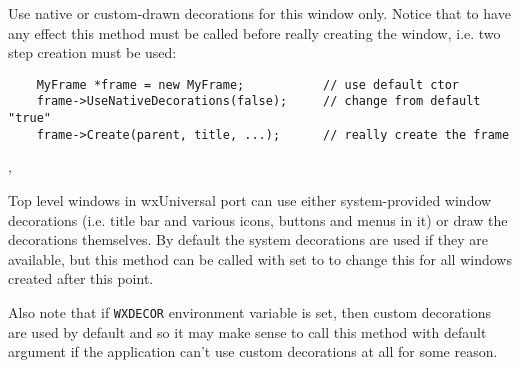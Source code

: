 

\label{wxtoplevelwindowusenativedecorations}



Use native or custom-drawn decorations for this window only. Notice that to
have any effect this method must be called before really creating the window,
i.e. two step creation must be used:
\begin{verbatim}
    MyFrame *frame = new MyFrame;           // use default ctor
    frame->UseNativeDecorations(false);     // change from default "true"
    frame->Create(parent, title, ...);      // really create the frame
\end{verbatim}


,\\


\label{wxtoplevelwindowusenativedecorationsbydefault}



Top level windows in wxUniversal port can use either system-provided window
decorations (i.e. title bar and various icons, buttons and menus in it) or draw
the decorations themselves. By default the system decorations are used if they
are available, but this method can be called with  set to \false to
change this for all windows created after this point.

Also note that if \texttt{WXDECOR} environment variable is set, then custom
decorations are used by default and so it may make sense to call this method
with default argument if the application can't use custom decorations at all
for some reason.



